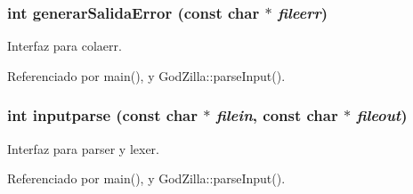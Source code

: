 \subsubsection{\setlength{\rightskip}{0pt plus 5cm}int generar\-Salida\-Error (const char $\ast$ {\em fileerr})}\label{parserheader_8h_a1}


Interfaz para colaerr. 



Referenciado por main(), y God\-Zilla::parse\-Input().
\subsubsection{\setlength{\rightskip}{0pt plus 5cm}int inputparse (const char $\ast$ {\em filein}, const char $\ast$ {\em fileout})}\label{parserheader_8h_a0}


Interfaz para parser y lexer. 



Referenciado por main(), y God\-Zilla::parse\-Input().